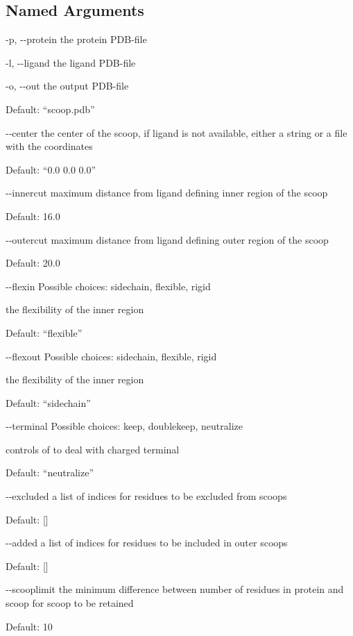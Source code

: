 \documentclass[letterpaper,10pt,english]{sphinxmanual}
\begin{document}
\subsection{Named Arguments}
\label{\detokenize{tools:Named Arguments}}\begin{optionlist}{3cm}
\item [-p, -{-}protein]  
the protein PDB-file
\item [-l, -{-}ligand]  
the ligand PDB-file
\item [-o, -{-}out]  
the output PDB-file

Default: “scoop.pdb”
\item [-{-}center]  
the center of the scoop, if ligand is not available, either a string or a file with the coordinates

Default: “0.0 0.0 0.0”
\item [-{-}innercut]  
maximum distance from ligand defining inner region of the scoop

Default: 16.0
\item [-{-}outercut]  
maximum distance from ligand defining outer region of the scoop

Default: 20.0
\item [-{-}flexin]  
Possible choices: sidechain, flexible, rigid

the flexibility of the inner region

Default: “flexible”
\item [-{-}flexout]  
Possible choices: sidechain, flexible, rigid

the flexibility of the inner region

Default: “sidechain”
\item [-{-}terminal]  
Possible choices: keep, doublekeep, neutralize

controls of to deal with charged terminal

Default: “neutralize”
\item [-{-}excluded]  
a list of indices for residues to be excluded from scoops

Default: {[}{]}
\item [-{-}added]  
a list of indices for residues to be included in outer scoops

Default: {[}{]}
\item [-{-}scooplimit]  
the minimum difference between number of residues in protein and scoop for scoop to be retained

Default: 10
\end{optionlist}
\end{document}

